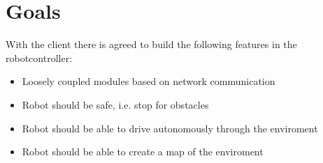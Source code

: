 \documentclass[a4paper,10pt]{article}
\begin{document}
\newpage

\section{Goals}
With the client there is agreed to build the following features in the robotcontroller:
\begin{itemize}
\item Loosely coupled modules based on network communication
\item Robot should be safe, i.e. stop for obstacles
\item Robot should be able to drive autonomously through the enviroment
\item Robot should be able to create a map of the enviroment
\end{itemize}
\end{document}
